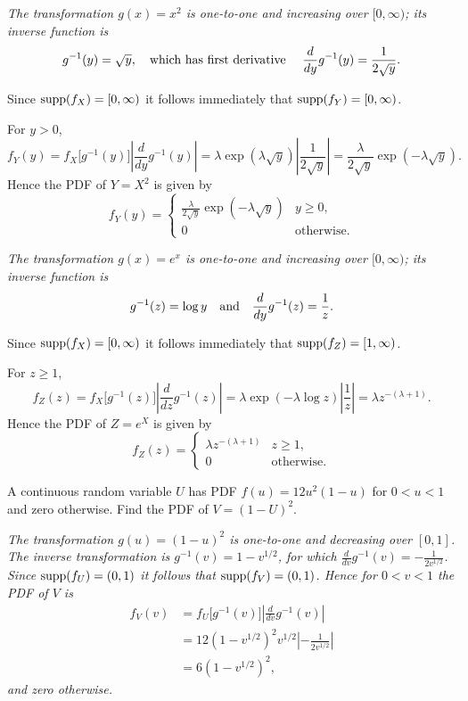\begin{exercise}
\begin{questions}
\begin{answer}
\ben
\it %
The transformation $g(x)=x^2$ is one-to-one and increasing over $[0,\infty)$; its inverse function is
\[
g^{-1}(y) =  \sqrt{y},\text{\quad which has first derivative \quad} \frac{d}{dy}g^{-1}(y) = \frac{1}{2\sqrt{y}}.
\]

Since $\text{supp}(f_X)=[0,\infty)$ it follows immediately that $\text{supp}(f_Y)=[0,\infty)$.
\par
For $y>0$, 
\[
f_Y(y) 
	= f_X\big[g^{-1}(y)\big]\left|\frac{d}{dy}g^{-1}(y)\right| 
	= \lambda\exp(\lambda\sqrt{y}) \left| \frac{1}{2\sqrt{y}}\right|
	= \frac{\lambda}{2\sqrt{y}}\exp(-\lambda\sqrt{y}).
\]
Hence the PDF of $Y=X^2$ is given by
\[
f_Y(y) = \left\{\begin{array}{ll}
	\displaystyle\frac{\lambda}{2\sqrt{y}}\exp(-\lambda\sqrt{y}) & y\geq 0, \\[2ex]
	0 & \text{otherwise}.
\end{array}\right.
\]

\it %
The transformation $g(x)=e^x$ is one-to-one and increasing over $[0,\infty)$; its inverse function is
\[
g^{-1}(z) = \log y \text{\quad and\quad} \frac{d}{dy}g^{-1}(z) = \frac{1}{z}.
\]

Since $\text{supp}(f_X)=[0,\infty)$ it follows immediately that $\text{supp}(f_Z)=[1,\infty)$.
\par
For $z\geq 1$,
\[
f_Z(z) 
	= f_X\big[g^{-1}(z)\big]\left|\frac{d}{dz}g^{-1}(z)\right|
	= \lambda\exp(-\lambda\log z)\left|\frac{1}{z}\right| 
	= \lambda z^{-(\lambda+1)}.
\]
Hence the PDF of $Z=e^X$ is given by
\[
f_Z(z) = \left\{\begin{array}{ll}
	\lambda z^{-(\lambda+1)} & z\geq 1, \\
	0 & \text{otherwise}.
\end{array}\right.
\]
\een
\end{answer}

\question %
A continuous random variable $U$ has PDF
$f(u) = 12u^{2}(1-u)$ for $0 < u < 1$ and zero otherwise.
Find the PDF of $V = (1 - U)^{2}$.
\begin{answer}
\bit
\it The transformation $g(u) = (1 - u)^{2}$ is one-to-one and decreasing over $[0,1]$.  
\it The inverse transformation is $g^{-1}(v) = 1 - v^{1/2}$, for which $\displaystyle \frac{d}{dv}g^{-1}(v) = -\frac{1}{2v^{1/2}}$.
\it Since $\text{supp}(f_U)=(0,1)$ it follows that $\text{supp}(f_V)=(0,1)$. 
\eit
Hence for $0<v<1$ the PDF of $V$ is 
\begin{align*}
f_V(v)
	& = f_U\big[g^{-1}(v)\big]\left|\frac{d}{dv}g^{-1}(v)\right| \\
	& = 12(1-v^{1/2})^2 v^{1/2}\left|-\frac{1}{2v^{1/2}}\right| \\
	& = 6(1-v^{1/2})^2,
\end{align*}
and zero otherwise. 
\end{answer}


\end{questions}
\end{exercise}
